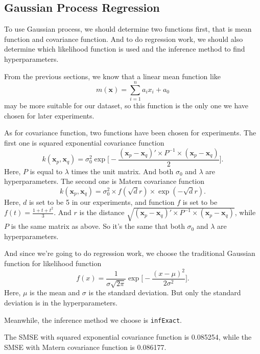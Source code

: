 \documentclass[a4paper]{article}
\newcommand{\bfx}{\mathbf{x}}
\begin{document}
\subsection{Gaussian Process Regression}
To use Gaussian process, we should determine two functions first, that is mean function and covariance function. And to do regression work, we should also determine which likelihood function is used and the inference method to find hyperparameters.

From the previous sections, we know that a linear mean function like
\begin{equation}
m(\bfx)=\sum_{i=1}^n a_ix_i + a_0
\end{equation}
may be more suitable for our dataset, so this function is the only one we have chosen for later experiments.

As for covariance function, two functions have been chosen for experiments. The first one is squared exponential covariance function
\begin{equation}
k(\bfx_p,\bfx_q)=\sigma_0^2\exp\Big[-\frac{(\bfx_p-\bfx_q)'\times P^{-1} \times (\bfx_p-\bfx_q)}{2}\Big].
\end{equation}
Here, $P$ is equal to $\lambda$ times the unit matrix. And both $\sigma_0$ and $\lambda$ are hyperparameters. The second one is Matern covariance function
\begin{equation}
k(\bfx_p,\bfx_q)=\sigma_0^2\times f(\sqrt{d}r)\times \exp(-\sqrt{d}r).
\end{equation}
Here, $d$ is set to be 5 in our experiments, and function $f$ is set to be $f(t)=\frac{1+t+t^2}{3}$. And $r$ is the distance $\sqrt{(\bfx_p-\bfx_q)'\times P^{-1} \times (\bfx_p-\bfx_q)}$, while $P$ is the same matrix as above. So it's the same that both $\sigma_0$ and $\lambda$ are hyperparameters.

And since we're going to do regression work, we choose the traditional Gaussian function for likelihood function
\begin{equation}
f(x)=\frac{1}{\sigma\sqrt{2\pi}} \exp\Big[ -\frac{(x-\mu)^2}{2\sigma^2} \Big].
\end{equation}
Here, $\mu$ is the mean and $\sigma$ is the standard deviation. But only the standard deviation is in the hyperparameters.

Meanwhile, the inference method we choose is \texttt{infExact}.

The SMSE with squared exponential covariance function is 0.085254, while the SMSE with Matern covariance function is 0.086177.


\end{document}
